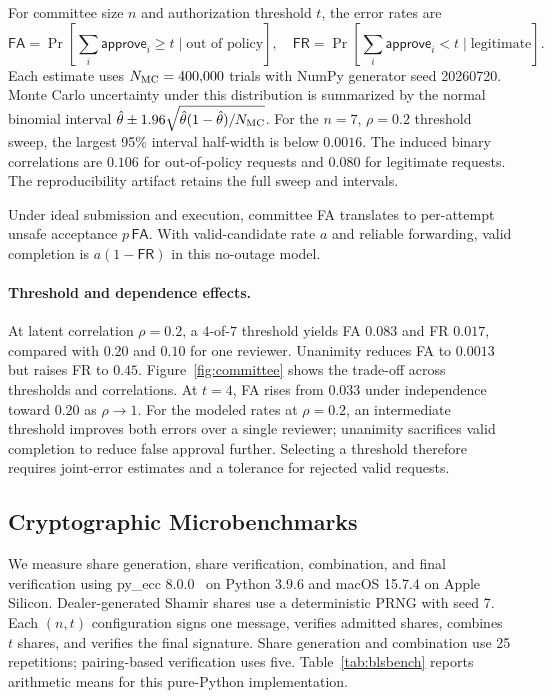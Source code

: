 \documentclass{article}
\begin{document}
For committee size $n$ and authorization threshold $t$, the error rates are
\begin{equation}
 \mathsf{FA}=\Pr\!\left[\textstyle\sum_i \mathsf{approve}_i\ge t
   \mid\text{out of policy}\right],\quad
 \mathsf{FR}=\Pr\!\left[\textstyle\sum_i \mathsf{approve}_i<t
   \mid\text{legitimate}\right].
\end{equation}
Each estimate uses $N_{\rm MC}=400{,}000$ trials with NumPy generator seed
20260720. Monte Carlo uncertainty under this distribution is summarized by
the normal binomial interval
$\hat\theta\pm1.96\sqrt{\hat\theta(1-\hat\theta)/N_{\rm MC}}$.
For the $n=7$, $\rho=0.2$ threshold sweep, the largest 95\% interval
half-width is below $0.0016$. The induced binary correlations are $0.106$
for out-of-policy requests and $0.080$ for legitimate requests.
The reproducibility artifact retains the full sweep and intervals.

Under ideal submission and execution, committee FA translates to per-attempt
unsafe acceptance $p\,\mathsf{FA}$. With valid-candidate rate $a$ and reliable
forwarding, valid completion is $a(1-\mathsf{FR})$ in this no-outage model.

\paragraph{Threshold and dependence effects.}
At latent correlation $\rho=0.2$, a $4$-of-$7$ threshold yields FA $0.083$
and FR $0.017$, compared with $0.20$ and $0.10$ for one reviewer. Unanimity
reduces FA to $0.0013$ but raises FR to $0.45$.
Figure~\ref{fig:committee} shows the trade-off across thresholds and correlations.
At $t=4$, FA rises from $0.033$ under independence toward $0.20$ as
$\rho\rightarrow1$. For the modeled rates at $\rho=0.2$, an intermediate
threshold improves both errors over a single reviewer; unanimity sacrifices
valid completion to reduce false approval further. Selecting a threshold
therefore requires joint-error estimates and a tolerance for rejected valid
requests.

\subsection{Cryptographic Microbenchmarks}
\label{app:benchmarks}

We measure share generation, share verification, combination, and final
verification using py\_ecc 8.0.0~\citep{pyecc} on Python 3.9.6 and macOS 15.7.4 on Apple
Silicon. Dealer-generated Shamir shares use a deterministic PRNG with seed 7.
Each $(n,t)$ configuration signs one message, verifies admitted shares,
combines $t$ shares, and verifies the final signature. Share generation and
combination use 25 repetitions; pairing-based verification uses five.
Table~\ref{tab:blsbench} reports arithmetic means for this pure-Python
implementation.
\end{document}
